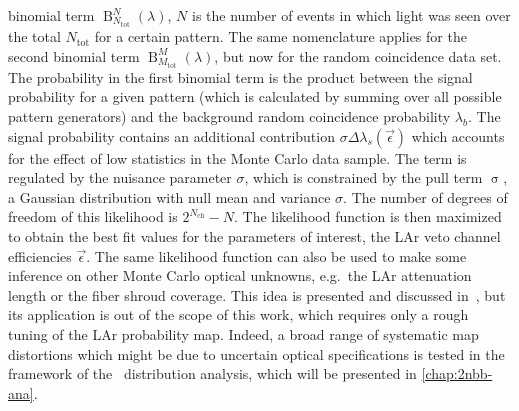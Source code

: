 binomial term $\operatorname{B}^N_{N_\text{tot}}(\lambda)$, $N$ is the number of events in
which light was seen over the total $N_\text{tot}$ for a certain pattern. The same
nomenclature applies for the second binomial term
$\operatorname{B}^M_{M_\text{tot}}(\lambda)$, but now for the random coincidence data set.
The probability in the first binomial term is the product between the signal probability
for a given pattern (which is calculated by summing over all possible pattern generators)
and the background random coincidence probability $\lambda_b$. The signal probability
contains an additional contribution $\sigma \Delta\lambda_s(\vec{\epsilon})$ which
accounts for the effect of low statistics in the Monte Carlo data sample. The term is
regulated by the nuisance parameter $\sigma$, which is constrained by the pull term
$\operatorname{\sigma}$, a Gaussian distribution with null mean and variance $\sigma$. The
number of degrees of freedom of this likelihood is $2^{N_\text{ch}}-N$.
\newpar
The likelihood function is then maximized to obtain the best fit values for the parameters
of interest, the LAr veto channel efficiencies $\vec{\epsilon}$. The same likelihood
function can also be used to make some inference on other Monte Carlo optical unknowns,
e.g.~the LAr attenuation length or the fiber shroud coverage. This idea is presented and
discussed in~\cite{Wiesinger2021}, but its application is out of the scope of this work,
which requires only a rough tuning of the LAr probability map. Indeed, a broad range of
systematic map distortions which might be due to uncertain optical specifications is
tested in the framework of the \nnbb\ distribution analysis, which will be presented in
\cref{chap:2nbb-ana}.

